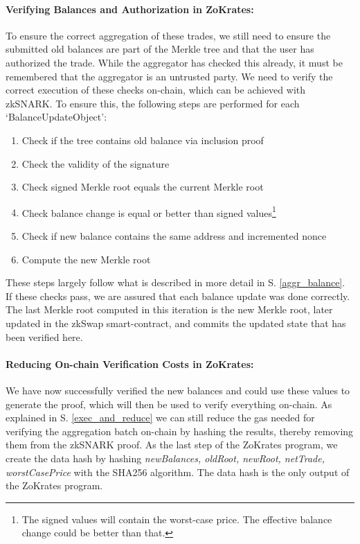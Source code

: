 \documentclass[../../thesis.tex]{subfiles}
\begin{document}
\paragraph{Verifying Balances and Authorization in ZoKrates:}
To ensure the correct aggregation of these trades, we still need to ensure the submitted old balances are part of the Merkle tree and that the user has authorized the trade. While the aggregator has checked this already, it must be remembered that the aggregator is an untrusted party. We need to verify the correct execution of these checks on-chain, which can be achieved with zkSNARK. To ensure this, the following steps are performed for each `BalanceUpdateObject':

\begin{enumerate}
    \item Check if the tree contains old balance via inclusion proof
    \item Check the validity of the signature
    \item Check signed Merkle root equals the current Merkle root
    \item Check balance change is equal or better than signed values\footnote{The signed values will contain the worst-case price. The effective balance change could be better than that.}
    \item Check if new balance contains the same address and incremented nonce
    \item Compute the new Merkle root
\end{enumerate}

These steps largely follow what is described in more detail in S. \ref{aggr_balance}. If these checks pass, we are assured that each balance update was done correctly. The last Merkle root computed in this iteration is the new Merkle root, later updated in the zkSwap smart-contract, and commits the updated state that has been verified here.

\paragraph{Reducing On-chain Verification Costs in ZoKrates:}
We have now successfully verified the new balances and could use these values to generate the proof, which will then be used to verify everything on-chain. As explained in S. \ref{exec_and_reduce} we can still reduce the gas needed for verifying the aggregation batch on-chain by hashing the results, thereby removing them from the zkSNARK proof. As the last step of the ZoKrates program, we create the data hash by hashing \textit{newBalances, oldRoot, newRoot, netTrade, worstCasePrice} with the SHA256 algorithm. The data hash is the only output of the ZoKrates program.
\end{document}
